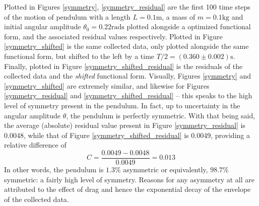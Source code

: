 Plotted in Figures \ref{symmetry}, \ref{symmetry_residual} are the first 100 
time steps of the motion of pendulum with a length $L = 0.1\text{m}$, a mass 
of $m = 0.1\text{kg}$ and initial angular amplitude $\theta_0 = 0.22\text{rads}$ 
plotted alongside a optimized functional form, and the associated residual 
values respectively. Plotted in Figure \ref{symmetry_shifted} is the same 
collected data, only plotted alongside the same functional form, but shifted 
to the left by a time $T/2 = (0.360\pm 0.002)\text{s}$. Finally, plotted in 
Figure \ref{symmetry_shifted_residual} is the residuals of the collected data 
and the \emph{shifted} functional form. Visually, Figures \ref{symmetry} and 
\ref{symmetry_shifted} are extremely similar, and likewise for Figures 
\ref{symmetry_residual} and \ref{symmetry_shifted_residual} -- this speaks 
to the high level of symmetry present in the pendulum. In fact, up to 
uncertainty in the angular amplitude $\theta$, the pendulum is perfectly 
symmetric. With that being said, the average (absolute) residual value present 
in Figure \ref{symmetry_residual} is 0.0048, while that of Figure 
\ref{symmetry_shifted_residual} is 0.0049, providing a relative difference of 
\[C = \frac{0.0049 - 0.0048}{0.0049} = 0.013\]
In other words, the pendulum is $1.3\%$ asymmetric or equivalently, 
$98.7\%$ symmetric: a fairly high level of symmetry. Reasons for any asymmetry 
at all are attributed to the effect of drag and hence the exponential decay of 
the envelope of the collected data.\\[0.20cm]
